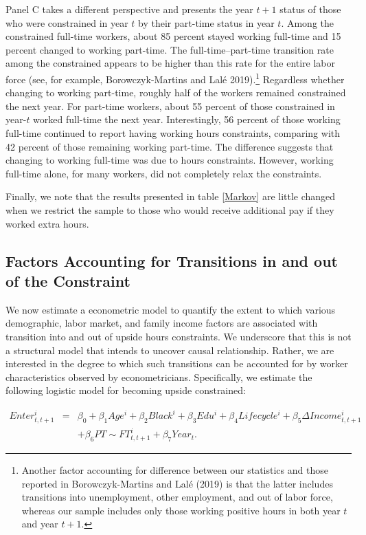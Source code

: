 Panel C takes a different perspective and presents the year $t+1$ status of those who were constrained in year $t$ by their part-time status in year $t$. Among the constrained full-time workers, about 85 percent stayed working full-time and 15 percent changed to working part-time. The full-time--part-time transition rate among the constrained appears to be higher than this rate for the entire labor force (see, for example, Borowczyk-Martins and Lal\'{e} 2019).\footnote{Another factor accounting for difference between our statistics and those reported in Borowczyk-Martins and Lal\'{e} (2019) is that the latter includes transitions into unemployment, other employment, and out of labor force, whereas our sample includes only those working positive hours in both year $t$ and year $t+1$.} Regardless whether changing to working part-time, roughly half of the workers remained constrained the next year. For part-time workers, about 55 percent of those constrained in year-$t$ worked full-time the next year.  Interestingly, 56 percent of those working full-time continued to report having working hours constraints, comparing with 42 percent of those remaining working part-time. The difference suggests that changing to working full-time was due to hours constraints. However, working full-time alone, for many workers, did not completely relax the constraints.

Finally, we note that the results presented in table \ref{Markov} are little changed when we restrict the sample to those who would receive additional pay if they worked extra hours.

\subsection{Factors Accounting for Transitions in and out of the Constraint}

We now estimate a econometric model to quantify the extent to which various demographic, labor market, and family income factors are associated with transition into and out of upside hours constraints.  We underscore that this is not a structural model that intends to uncover causal relationship.  Rather, we are interested in the degree to which such transitions can be accounted for by worker characteristics observed by econometricians. Specifically, we estimate the following logistic model for becoming upside constrained:

\begin{eqnarray}
Enter_{t, t+1}^i & = & \beta_0 + \beta_1 Age^i + \beta_2 Black^i + \beta_3 Edu^i + \beta_4 Lifecycle^i + \beta_5 \Delta Income_{t, t+1}^i \\
                 &   & + \beta_6 PT\sim FT_{t, t+1}^i + \beta_7 Year_t. \nonumber \label{logitbc} 
\end{eqnarray}


